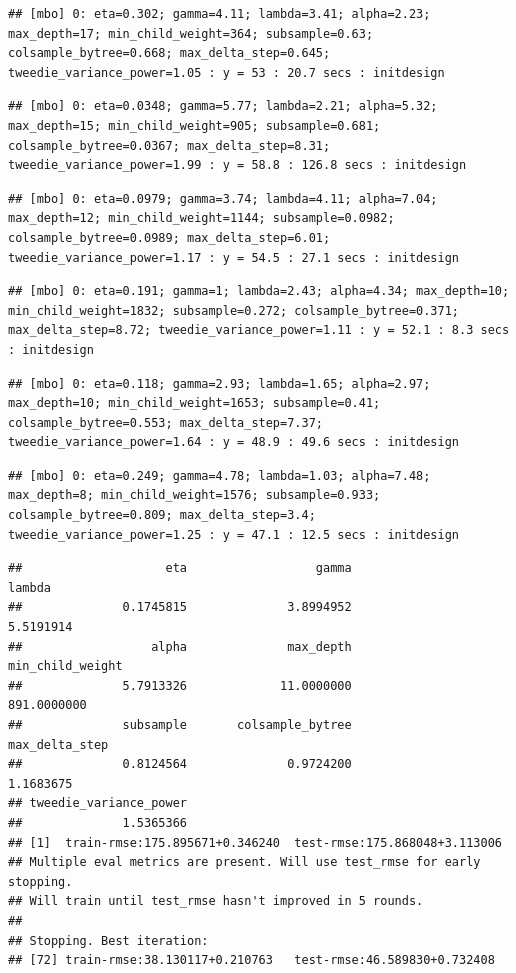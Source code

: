 \documentclass[
]{article}
\begin{document}
\begin{verbatim}
## [mbo] 0: eta=0.302; gamma=4.11; lambda=3.41; alpha=2.23; max_depth=17; min_child_weight=364; subsample=0.63; colsample_bytree=0.668; max_delta_step=0.645; tweedie_variance_power=1.05 : y = 53 : 20.7 secs : initdesign
\end{verbatim}

\begin{verbatim}
## [mbo] 0: eta=0.0348; gamma=5.77; lambda=2.21; alpha=5.32; max_depth=15; min_child_weight=905; subsample=0.681; colsample_bytree=0.0367; max_delta_step=8.31; tweedie_variance_power=1.99 : y = 58.8 : 126.8 secs : initdesign
\end{verbatim}

\begin{verbatim}
## [mbo] 0: eta=0.0979; gamma=3.74; lambda=4.11; alpha=7.04; max_depth=12; min_child_weight=1144; subsample=0.0982; colsample_bytree=0.0989; max_delta_step=6.01; tweedie_variance_power=1.17 : y = 54.5 : 27.1 secs : initdesign
\end{verbatim}

\begin{verbatim}
## [mbo] 0: eta=0.191; gamma=1; lambda=2.43; alpha=4.34; max_depth=10; min_child_weight=1832; subsample=0.272; colsample_bytree=0.371; max_delta_step=8.72; tweedie_variance_power=1.11 : y = 52.1 : 8.3 secs : initdesign
\end{verbatim}

\begin{verbatim}
## [mbo] 0: eta=0.118; gamma=2.93; lambda=1.65; alpha=2.97; max_depth=10; min_child_weight=1653; subsample=0.41; colsample_bytree=0.553; max_delta_step=7.37; tweedie_variance_power=1.64 : y = 48.9 : 49.6 secs : initdesign
\end{verbatim}

\begin{verbatim}
## [mbo] 0: eta=0.249; gamma=4.78; lambda=1.03; alpha=7.48; max_depth=8; min_child_weight=1576; subsample=0.933; colsample_bytree=0.809; max_delta_step=3.4; tweedie_variance_power=1.25 : y = 47.1 : 12.5 secs : initdesign
\end{verbatim}

\begin{verbatim}
##                    eta                  gamma                 lambda 
##              0.1745815              3.8994952              5.5191914 
##                  alpha              max_depth       min_child_weight 
##              5.7913326             11.0000000            891.0000000 
##              subsample       colsample_bytree         max_delta_step 
##              0.8124564              0.9724200              1.1683675 
## tweedie_variance_power 
##              1.5365366 
## [1]  train-rmse:175.895671+0.346240  test-rmse:175.868048+3.113006 
## Multiple eval metrics are present. Will use test_rmse for early stopping.
## Will train until test_rmse hasn't improved in 5 rounds.
## 
## Stopping. Best iteration:
## [72] train-rmse:38.130117+0.210763   test-rmse:46.589830+0.732408
\end{verbatim}
\end{document}
